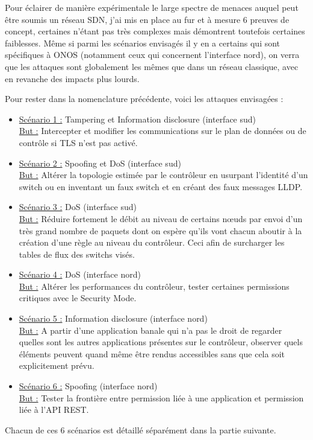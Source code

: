 Pour éclairer de manière expérimentale le large spectre de menaces auquel peut être soumis un réseau SDN, j'ai mis en place au fur et à mesure 6 preuves de concept, certaines n'étant pas très complexes mais démontrent toutefois certaines faiblesses. Même si parmi les scénarios envisagés il y en a certains qui sont spécifiques à ONOS (notamment ceux qui concernent l'interface nord), on verra que les attaques sont globalement les mêmes que dans un réseau classique, avec en revanche des impacts plus lourds.

Pour rester dans la nomenclature précédente, voici les attaques envisagées :

\begin{itemize}

\item \underline{Scénario 1 :} Tampering et Information disclosure (interface sud) \\
\underline{But :} Intercepter et modifier les communications sur le plan de données ou de contrôle si TLS n'est pas activé.

\item \underline{Scénario 2 :} Spoofing et DoS (interface sud) \\
\underline{But :} Altérer la topologie estimée par le contrôleur en usurpant l'identité d'un switch ou en inventant un faux switch et en créant des faux messages LLDP.

\item \underline{Scénario 3 :} DoS (interface sud) \\
\underline{But :} Réduire fortement le débit au niveau de certains nœuds par envoi d'un très grand nombre de paquets dont on espère qu'ils vont chacun aboutir à la création d'une règle au niveau du contrôleur. Ceci afin de surcharger les tables de flux des switchs visés.

\item \underline{Scénario 4 :} DoS (interface nord) \\
\underline{But :} Altérer les performances du contrôleur, tester certaines permissions critiques avec le Security Mode.

\item \underline{Scénario 5 :} Information disclosure (interface nord) \\
\underline{But :} A partir d'une application banale qui n'a pas le droit de regarder quelles sont les autres applications présentes sur le contrôleur, observer quels éléments peuvent quand même être rendus accessibles sans que cela soit explicitement prévu.

\item \underline{Scénario 6 :} Spoofing (interface nord) \\
\underline{But :} Tester la frontière entre permission liée à une application et permission liée à l'API REST.

\end{itemize}

Chacun de ces 6 scénarios est détaillé séparément dans la partie suivante.